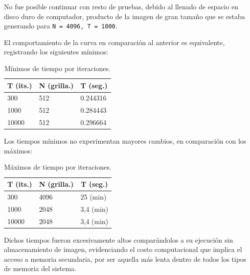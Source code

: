 \documentclass[jou]{apa6}
\begin{document}
No fue posible continuar con resto de pruebas, debido al llenado de espacio en disco duro de computador, producto de la imagen de gran tamaño que se estaba generando para \texttt{N = 4096, T = 1000}.

El comportamiento de la curva en comparación al anterior es equivalente, registrando los siguientes mínimos:

\begin{table}[h]
\centering
\caption{Mínimos de tiempo por iteraciones.}
\label{my-label}
\begin{tabular}{@{}lll@{}}
\toprule
\multicolumn{1}{c}{T (its.)} & \multicolumn{1}{c}{N (grilla.)} & \multicolumn{1}{c}{T (seg.)} \\ \midrule
300                          & 512                          & 0.244316                     \\
1000                         & 512                          & 0.284443                     \\
10000                        & 512                          & 0.296664                     \\ \bottomrule
\end{tabular}
\end{table}

\clearpage

Los tiempos mínimos no experimentan mayores cambios, en comparación con los máximos:

\begin{table}[h]
	\centering
	\caption{Máximos de tiempo por iteraciones.}
	\label{my-label}
	\begin{tabular}{@{}lll@{}}
		\toprule
		\multicolumn{1}{c}{T (its.)} & \multicolumn{1}{c}{N (grilla.)} & \multicolumn{1}{c}{T (seg.)} \\ \midrule
		300                          & 4096                         & 25 (min)                     \\
		1000                         & 2048                         & 3,4 (min)                    \\
		10000                        & 2048                         & 3,4 (min)                    \\ \bottomrule
	\end{tabular}
\end{table}

Dichos tiempos fueron excesivamente altos comparándolos a su ejecución sin almacenamiento de imagen, evidenciando el costo computacional que implica el acceso a memoria secundaria, por ser aquella más lenta dentro de todos los tipos de memoria del sistema.
\end{document}
